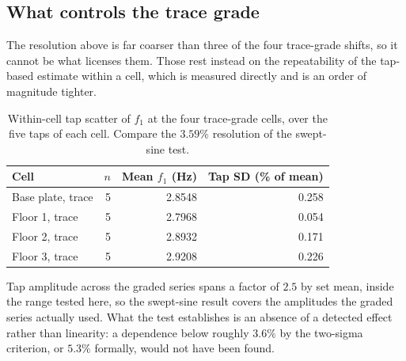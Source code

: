 \subsection*{What controls the trace grade}

The resolution above is far coarser than three of the four trace-grade shifts, so
it cannot be what licenses them. Those rest instead on the repeatability of the
tap-based estimate within a cell, which is measured directly and is an order of
magnitude tighter.

\begin{table}[htbp]
\centering
\caption{Within-cell tap scatter of $f_1$ at the four trace-grade cells, over the
five taps of each cell. Compare the $3.59\%$ resolution of the swept-sine test.}
\label{tab:lin-trace}
\begin{tabular}{lrrr}
\toprule
Cell & $n$ & Mean $f_1$ (Hz) & Tap SD (\% of mean) \\
\midrule
Base plate, trace & 5 & 2.8548 & 0.258 \\
Floor 1, trace    & 5 & 2.7968 & 0.054 \\
Floor 2, trace    & 5 & 2.8932 & 0.171 \\
Floor 3, trace    & 5 & 2.9208 & 0.226 \\
\bottomrule
\end{tabular}
\end{table}

Tap amplitude across the graded series spans a factor of $2.5$ by set mean,
inside the range tested here, so the swept-sine result covers the amplitudes the
graded series actually used. What the test establishes is an absence of a
detected effect rather than linearity: a dependence below roughly $3.6\%$ by the
two-sigma criterion, or $5.3\%$ formally, would not have been found.
